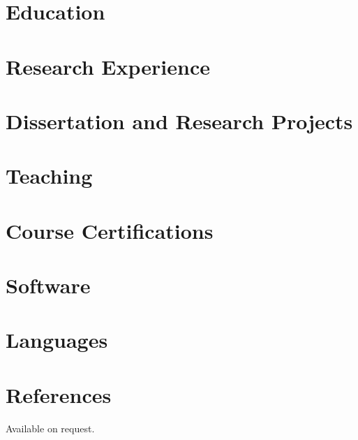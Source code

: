 \documentclass{prometheus_cv}
\begin{document}
\thispagestyle{empty}					%
\pagestyle{fancy}			 		%

\vspace*{-1cm}
\centering 

\section{Education}

\vspace{-0.8em}
\section{Research Experience}

\vspace{-0.8em}
\section{Dissertation and Research Projects}

\vspace{-0.8em}
\section{Teaching}

\vspace{-0.8em}

\section{Course Certifications}

\vspace{-0.8em}

\section{Software}

\vspace{-0.8em}
\section{Languages}


\section{References}
Available on request.
\end{document}
